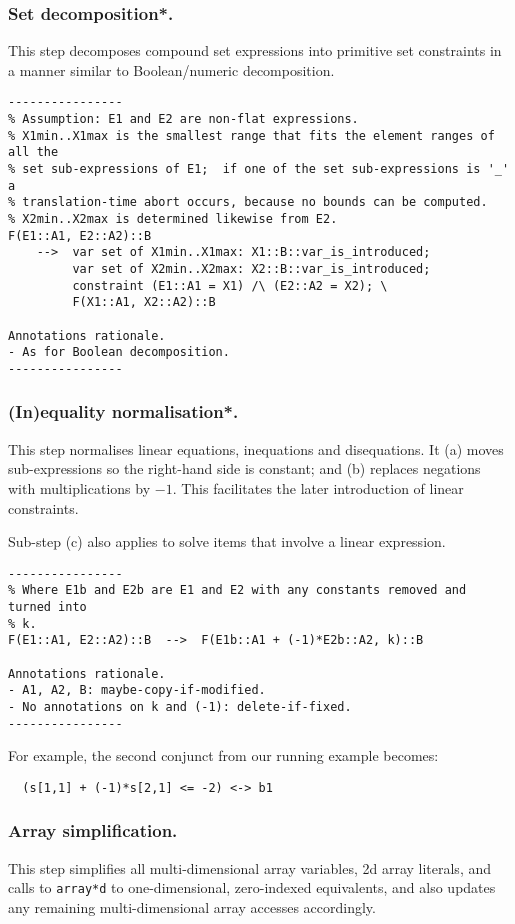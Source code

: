 \documentclass[10pt]{article}
\begin{document}
\subsubsection{Set decomposition*.}
This step decomposes compound set expressions into primitive set constraints
in a manner similar to Boolean/numeric decomposition.

\begin{verbatim}
----------------
% Assumption: E1 and E2 are non-flat expressions.
% X1min..X1max is the smallest range that fits the element ranges of all the
% set sub-expressions of E1;  if one of the set sub-expressions is '_' a
% translation-time abort occurs, because no bounds can be computed.
% X2min..X2max is determined likewise from E2.
F(E1::A1, E2::A2)::B
    -->  var set of X1min..X1max: X1::B::var_is_introduced;
         var set of X2min..X2max: X2::B::var_is_introduced;
         constraint (E1::A1 = X1) /\ (E2::A2 = X2); \
         F(X1::A1, X2::A2)::B

Annotations rationale.
- As for Boolean decomposition.
----------------
\end{verbatim}


\subsubsection{(In)equality normalisation*.}
This step normalises linear equations, inequations and disequations.  It (a)
moves sub-expressions so the right-hand side is constant;  and (b) replaces
negations with multiplications by $-1$.  This facilitates the later
introduction of linear constraints.

Sub-step (c) also applies to solve items that involve a linear expression.

\begin{verbatim}
----------------
% Where E1b and E2b are E1 and E2 with any constants removed and turned into
% k.
F(E1::A1, E2::A2)::B  -->  F(E1b::A1 + (-1)*E2b::A2, k)::B

Annotations rationale.
- A1, A2, B: maybe-copy-if-modified.
- No annotations on k and (-1): delete-if-fixed.
----------------
\end{verbatim}

For example, the second conjunct from our running example becomes:
\begin{verbatim}
  (s[1,1] + (-1)*s[2,1] <= -2) <-> b1
\end{verbatim}


\subsubsection{Array simplification.}
This step simplifies all multi-dimensional array variables, 2d array
literals, and calls to \texttt{array*d} to one-dimensional, zero-indexed
equivalents, and also updates any remaining multi-dimensional array accesses
accordingly.
\end{document}
